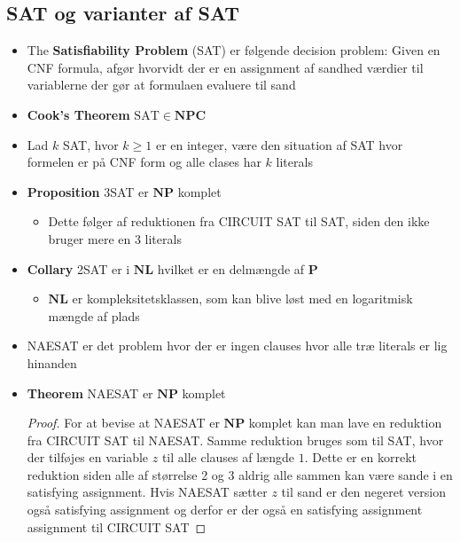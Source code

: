 \subsection{SAT og varianter af SAT}
\begin{itemize}
  \item The \textbf{Satisfiability Problem} (SAT) er følgende decision problem: Given en CNF formula, afgør hvorvidt der er en assignment af sandhed værdier til variablerne der gør at formulaen evaluere til sand
  \item \textbf{Cook's Theorem} $\text{SAT} \in \mathbf{NPC}$
  \item Lad $k$ SAT, hvor $k \geq 1$ er en integer, være den situation af SAT hvor formelen er på CNF form og alle clases har $k$ literals 
  \item \textbf{Proposition} 3SAT er $\mathbf{NP}$ komplet 
  \begin{itemize}
  	\item Dette følger af reduktionen fra CIRCUIT SAT til SAT, siden den ikke bruger mere en 3 literals
  \end{itemize} 
  \item \textbf{Collary} 2SAT er i $\mathbf{NL}$ hvilket er en delmængde af $\mathbf{P}$ 
  \begin{itemize}
  	\item $\mathbf{NL}$ er kompleksitetsklassen, som kan blive løst med en logaritmisk mængde af plads
  \end{itemize}
  \item NAESAT er det problem hvor der er ingen clauses hvor alle træ literals er lig hinanden 
  \item \textbf{Theorem} NAESAT er $\mathbf{NP}$ komplet
  \begin{proof} 
    For at bevise at NAESAT er $\mathbf{NP}$ komplet kan man lave en reduktion fra CIRCUIT SAT til NAESAT. Samme reduktion bruges som til SAT, hvor der tilføjes en variable $z$ til alle clauses af længde $1$. Dette er en korrekt reduktion siden alle af størrelse 2 og 3 aldrig alle sammen kan være sande i en satisfying assignment. Hvis NAESAT sætter $z$ til sand er den negeret version også satisfying assignment og derfor er der også en satisfying assignment assignment til CIRCUIT SAT
  \end{proof}
\end{itemize}

